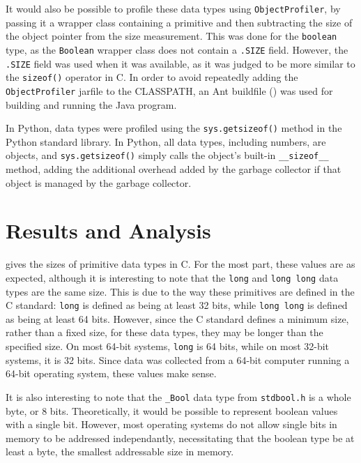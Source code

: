 \documentclass[12pt,letterpaper]{article}
\begin{document}
		It would also be possible to profile these data types using \texttt{ObjectProfiler}, by passing it a wrapper class containing a primitive and then subtracting the size of the object pointer from the size measurement. This was done for the \texttt{boolean} type, as the \texttt{Boolean} wrapper class does not contain a \texttt{.SIZE} field. However, the \texttt{.SIZE} field was used when it was available, as it was judged to be more similar to the \texttt{sizeof()} operator in C. In order to avoid repeatedly adding the \texttt{ObjectProfiler} jarfile to the CLASSPATH, an Ant buildfile () was used for building and running the Java program.

		In Python, data types were profiled using the \texttt{sys.getsizeof()} method in the Python standard library.  In Python, all data types, including numbers, are objects, and \texttt{sys.getsizeof()} simply calls the object's built-in \texttt{\_\_sizeof\_\_} method, adding the additional overhead added by the garbage collector if that object is managed by the garbage collector.
	\section {Results and Analysis}
		 gives the sizes of primitive data types in C. For the most part, these values are as expected, although it is interesting to note that the \texttt{long} and \texttt{long long} data types are the same size. This is due to the way these primitives are defined in the C standard: \texttt{long} is defined as being at least 32 bits, while \texttt{long long} is defined as being at least 64 bits. However, since the C standard defines a minimum size, rather than a fixed size, for these data types, they may be longer than the specified size. On most 64-bit systems, \texttt{long} is 64 bits, while on most 32-bit systems, it is 32 bits. Since data was collected from a 64-bit computer running a 64-bit operating system, these values make sense. 

		It is also interesting to note that the \texttt{\_Bool} data type from \texttt{stdbool.h} is a whole byte, or 8 bits. Theoretically, it would be possible to represent boolean values with a single bit. However, most operating systems do not allow single bits in memory to be addressed independantly, necessitating that the boolean type be at least a byte, the smallest addressable size in memory.
\end{document}
